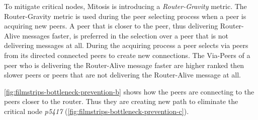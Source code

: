 To mitigate critical nodes, Mitosis is introducing a \textit{Router-Gravity} metric. The Router-Gravity metric is used during the peer selecting process when a peer is acquiring new peers. A peer that is closer to the \router peer, thus delivering Router-Alive messages faster, is preferred in the selection over a peer that is not delivering messages at all. 
During the acquiring process a peer selects via peers from its directed connected peers to create new connections. The Via-Peers of a peer who is delivering the Router-Alive message faster are higher ranked then slower peers or peers that are not delivering the Router-Alive message at all.

\vref{fig:filmstrips-bottleneck-prevention-b} shows how the peers are connecting to the peers closer to the router. Thus they are creating new path to eliminate the critical node \textit{p5417} (\vref{fig:filmstrips-bottleneck-prevention-c}).
